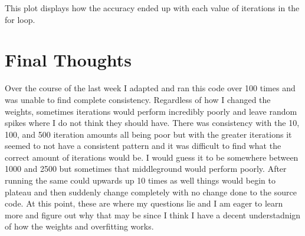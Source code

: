 \documentclass{article}
\begin{document}
This plot displays how the accuracy ended up with each value of iterations in the for loop. 

\section{Final Thoughts}
Over the course of the last week I adapted and ran this code over 100 times and was unable to find complete consistency. Regardless of how I changed the weights, sometimes iterations would perform incredibly poorly and leave random spikes where I do not think they should have. There was consistency with the 10, 100, and 500 iteration amounts all being poor but with the greater iterations it seemed to not have a consistent pattern and it was difficult to find what the correct amount of iterations would be. I would guess it to be somewhere between 1000 and 2500 but sometimes that middleground would perform poorly. After running the same could upwards up 10 times as well things would begin to plateau and then suddenly change completely with no change done to the source code. At this point, these are where my questions lie and I am eager to learn more and figure out why that may be since I think I have a decent understadnign of how the weights and overfitting works.
\end{document}
